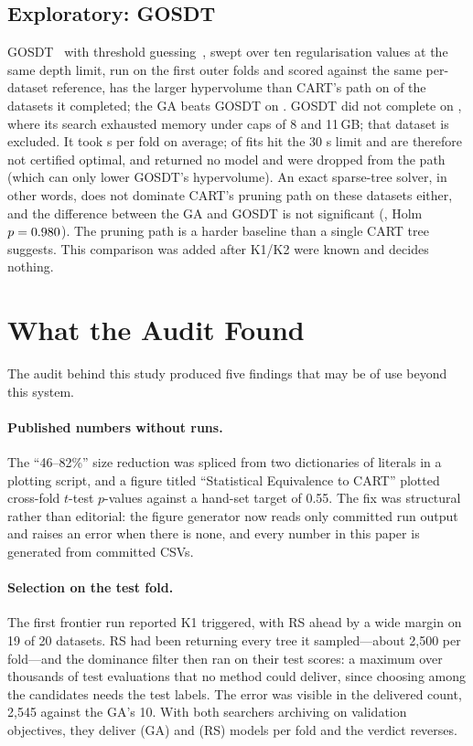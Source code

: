 \documentclass[sigconf,review,anonymous]{acmart}
\newcommand{\GA}{GA\xspace}
\newcommand{\RS}{RS\xspace}
\begin{document}
\subsection{Exploratory: GOSDT}
\label{sec:gosdt}

GOSDT~\cite{lin2020} with threshold guessing~\cite{mctavish2022}, swept over ten
regularisation values at the same depth limit, run on the first \GosdtFolds{} outer folds
and scored against the same per-dataset reference, has the larger hypervolume than
CART's path on \GosdtBeatsCart{} of the \GosdtDatasets{} datasets it completed; the \GA beats
GOSDT on \GABeatsGosdt. GOSDT did not complete on \GosdtIncompleteNames{}, where its search
exhausted memory under caps of 8 and 11\,GB; that dataset is excluded. It took \GosdtSeconds{} s per fold on average; \GosdtTimeouts{} of
\GosdtFits{} fits hit the 30 s limit and are therefore not certified optimal, and
\GosdtFailures{} returned no model and were dropped from the path (which can only lower
GOSDT's hypervolume). An
exact sparse-tree solver, in other words, does not dominate CART's pruning path on these
datasets either, and the difference between the \GA and GOSDT is not significant
(\GosdtDiff, Holm $p=0.980$). The pruning path is a harder baseline than a single CART tree suggests.
This comparison was added after K1/K2 were known and decides nothing.

\section{What the Audit Found}
\label{sec:audit}

The audit behind this study produced five findings that may be of use beyond this
system.

\paragraph{Published numbers without runs.} The ``46--82\%'' size reduction was spliced from
two dictionaries of literals in a plotting script, and a figure titled ``Statistical
Equivalence to CART'' plotted cross-fold $t$-test $p$-values against a hand-set target of
0.55. The fix was structural rather than editorial: the figure generator now reads only
committed run output and raises an error when there is none, and every number in this
paper is generated from committed CSVs.

\paragraph{Selection on the test fold.} The first frontier run reported K1 triggered, with
\RS{} ahead by a wide margin on 19 of 20 datasets. \RS{} had been returning every tree it
sampled---about 2{,}500 per fold---and the dominance filter then ran on their test
scores: a maximum over thousands of test evaluations that no method could deliver,
since choosing among the candidates needs the test labels. The error was visible in the delivered
count, 2{,}545 against the \GA's 10. With both searchers archiving on validation
objectives, they deliver \DeliveredGA{} (\GA) and \DeliveredRS{} (\RS) models per fold
and the verdict reverses.
\end{document}

